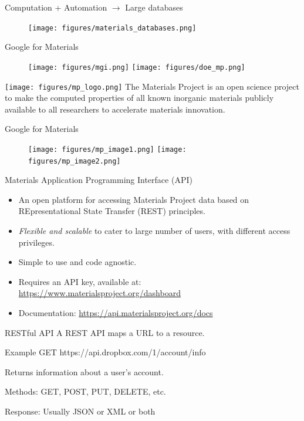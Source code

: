 \documentclass[aspectratio=169]{beamer}
\begin{document}
    \begin{frame}{Computation + Automation $\rightarrow$ Large databases}
        \begin{figure}
            \centering
            \texttt{[image: figures/materials\_databases.png]}
        \end{figure}
    \end{frame}


    \begin{frame}{Google for Materials}
        \begin{figure}
            \centering
            \texttt{[image: figures/mgi.png]}
            \texttt{[image: figures/doe\_mp.png]}
        \end{figure}
        \texttt{[image: figures/mp\_logo.png]}
        The Materials Project is an open science project to make the computed properties of all known inorganic materials publicly available to all researchers to accelerate materials innovation.
    \end{frame}


    \begin{frame}{Google for Materials}
        \begin{figure}
            \centering
            \texttt{[image: figures/mp\_image1.png]}
            \texttt{[image: figures/mp\_image2.png]}
        \end{figure}
    \end{frame}


    \begin{frame}{Materials Application Programming Interface (API)\cite{ongMaterialsApplicationProgramming2015}}
        \begin{itemize}
            \item An open platform for accessing Materials Project data based on REpresentational State Transfer (REST) principles.
            \item \textit{Flexible and scalable} to cater to large number of users, with different access privileges.
            \item Simple to use and code agnostic.
            \item Requires an API key, available at: \url{https://www.materialsproject.org/dashboard}
            \item Documentation: \url{https://api.materialsproject.org/docs}
        \end{itemize}
    \end{frame}


    \begin{frame}{RESTful API}
        A REST API maps a URL to a resource.
        \begin{exampleblock}{Example}
            GET https://api.dropbox.com/1/account/info
        \end{exampleblock}
        Returns information about a user’s account.

        Methods: GET, POST, PUT, DELETE, etc.

        Response: Usually JSON or XML or both
    \end{frame}
\end{document}
